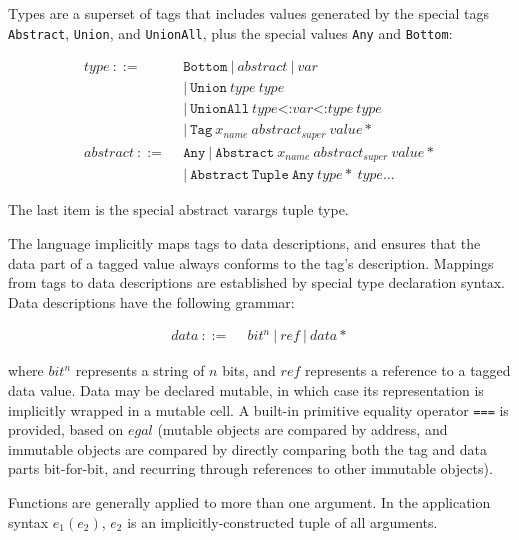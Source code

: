 Types are a superset of tags that includes values generated by the
special tags \texttt{Abstract}, \texttt{Union}, and \texttt{UnionAll},
plus the special values \texttt{Any} and \texttt{Bottom}:

\vspace{-3ex}
\begin{singlespace}
\begin{align*}
  type\ ::=\ &\ \texttt{Bottom}\ |\ abstract\ |\ var \\
             &\ |\ \texttt{Union}\ type\ type \\
             &\ |\ \texttt{UnionAll}\ type\texttt{<:}var\texttt{<:}type\ type \\
             &\ |\ \texttt{Tag}\ x_{name}\ abstract_{super}\ value* \\
  abstract\ ::=\ &\ \texttt{Any}\ |\ \texttt{Abstract}\ x_{name}\ abstract_{super}\ value* \\
                 &\ |\ \texttt{Abstract}\ \texttt{Tuple}\ \texttt{Any}\ type*\ type\texttt{...}
\end{align*}
\end{singlespace}

\noindent
The last item is the special abstract varargs tuple type.

The language implicitly maps tags to data descriptions, and ensures that
the data part of a tagged value always conforms to the tag's description.
Mappings from tags to data descriptions are established by special type
declaration syntax. Data descriptions have the following grammar:

\vspace{-3ex}
\begin{singlespace}
\begin{align*}
data\ ::=\ &\ bit^n\ |\ ref\ |\ data*
\end{align*}
\end{singlespace}

\noindent
where $bit^n$ represents a string of $n$ bits, and $ref$ represents a reference
to a tagged data value. Data may be declared mutable, in which case its
representation is implicitly wrapped in a mutable cell. A built-in primitive
equality operator \texttt{===} is provided, based on $egal$ \cite{egal}
(mutable objects are compared by address, and immutable objects are compared
by directly comparing both the tag and data parts bit-for-bit, and recurring
through references to other immutable objects).

Functions are generally applied to more than one argument. In the application
syntax $e_1(e_2)$, $e_2$ is an implicitly-constructed tuple of all arguments.

